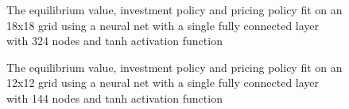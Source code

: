 \documentclass[12pt]{article}
\begin{document}
\begin{figure}[H]
  \centering
  \caption{The equilibrium value, investment policy and pricing policy fit on an 18x18 grid using a neural net with a single fully connected layer with 324 nodes and tanh activation function}
\end{figure}

\begin{figure}[H]
  \centering
  \caption{The equilibrium value, investment policy and pricing policy fit on an 12x12 grid using a neural net with a single fully connected layer with 144 nodes and tanh activation function}
\end{figure}
\end{document}
